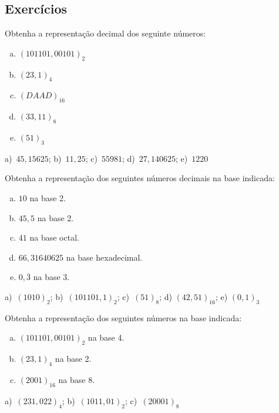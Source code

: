 \subsection{Exercícios}

\begin{exer}
  Obtenha a representação decimal dos seguinte números:
  \begin{enumerate}[a)]
  \item $(101101,00101)_2$
  \item $(23,1)_4$
  \item $(DAAD)_{16}$
  \item $(33,11)_8$
  \item $(51)_3$
  \end{enumerate}
\end{exer}
\begin{resp}
  a)~$45,15625$; b)~$11,25$; c)~$55981$; d)~$27,140625$; e)~$1220$
\end{resp}

\begin{exer}
  Obtenha a representação dos seguintes números decimais na base indicada:
  \begin{enumerate}[a)]
  \item $10$ na base 2.
  \item $45,5$ na base 2.
  \item $41$ na base octal.
  \item $66,31640625$ na base hexadecimal.
  \item $0,\overline{3}$ na base 3.
  \end{enumerate}
\end{exer}
\begin{resp}
  a)~$(1010)_2$; b)~$(101101,1)_2$; c)~$(51)_8$; d) $(42,51)_{16}$; e) $(0,1)_3$
\end{resp}

\begin{exer}
  Obtenha a representação dos seguintes números na base indicada:
  \begin{enumerate}[a)]
  \item $(101101,00101)_2$ na base 4.
  \item $(23,1)_4$ na base 2.
  \item $(2001)_{16}$ na base 8.
  \end{enumerate}
\end{exer}
\begin{resp}
   a)~$(231,022)_4$; b)~$(1011,01)_2$; c)~$(20001)_8$
\end{resp}

